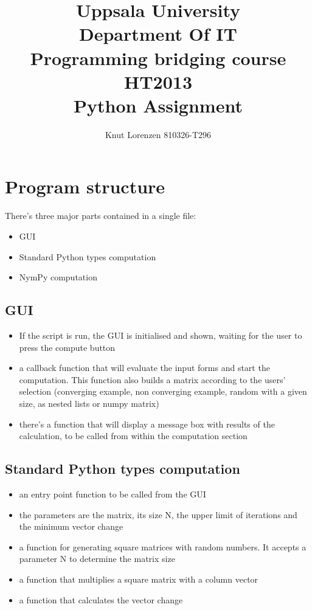 \documentclass[11pt]{amsart}
\title{ Uppsala University\\ Department Of IT \\Programming bridging course HT2013 \\Python Assignment}
\author{Knut Lorenzen 810326-T296}
\date{}                                           %
\begin{document}
\maketitle

\section{Program structure}

There's  three major parts contained in a single file:
\begin{itemize}
\item GUI
\item Standard Python types computation
\item NymPy computation
\end{itemize}

\subsection{GUI}
\begin{itemize}
\item If the script is run, the GUI is initialised and shown, waiting for the user to press the compute button
\item a callback function that will evaluate the input forms and start the computation. This function also builds a matrix according to the users' selection (converging example, non converging example, random with a given size, as nested lists or numpy matrix)
\item there's a function that will display a message box with results of the calculation, to be called from within the computation section
\end{itemize}

\subsection{Standard Python types computation}
\begin{itemize}
\item an entry point function to be called from the GUI
\item the parameters are the matrix, its size N, the upper limit of iterations and the minimum vector change
\item a function for generating square matrices with random numbers. 
It accepts a parameter N to determine the matrix size
\item a function that multiplies a square matrix with a column vector
\item a function that calculates the vector change
\end{itemize}
\end{document}
